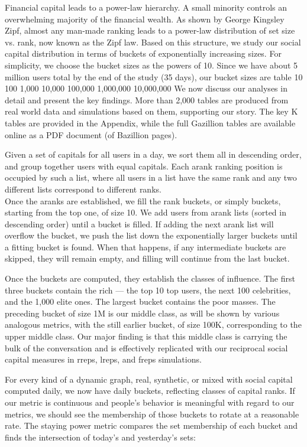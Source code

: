 \documentclass[10pt,oneside]{memoir}
\begin{document}
Financial capital leads to a power-law hierarchy.  A small minority controls an overwhelming majority of the financial wealth.  As shown by George Kingsley Zipf, almost any man-made ranking leads to a power-law distribution of set size vs. rank, now known as the Zipf law.  Based on this structure, we study our social capital distribution in terms of buckets of exponentially increasing sizes.
For simplicity, we choose the bucket sizes as the powers of 10.  Since we have about 5 million users total by the end of the study (35 days), our bucket sizes are
table
10 100 1,000 10,000 100,000 1,000,000 10,000,000
We now discuss our analyses in detail and present the key findings.  More than 2,000 tables are produced from real world data and simulations based on them, supporting our story.  The key K tables are provided in the Appendix, while the full Gazillion  tables are available online as a PDF document (of Bazillion pages).


Given a set of capitals for all users in a day, we sort them all in descending order, and group together users with equal capitals.  Each arank ranking position is occupied by such a list, where all users in a list have the same rank and any two different lists correspond to different ranks. \\
Once the aranks are established, we fill the rank buckets, or simply buckets, starting from the top one, of size 10.  We add users from arank lists (sorted in descending order) until a bucket is filled.  If adding the next arank list will overflow the bucket, we push the list down the exponentially larger buckets until a fitting bucket is found.  When that happens, if any intermediate buckets are skipped, they will remain empty, and filling will continue from the last bucket.


Once the buckets are computed, they establish the classes of influence.  The first three buckets contain the rich --- the top 10 top users, the next 100 celebrities, and the 1,000 elite ones.  The largest bucket contains the poor masses.  The preceding bucket of size 1M is our middle class, as will be shown by various analogous metrics, with the still earlier bucket, of size 100K, corresponding to the upper middle class. Our major finding is that this middle class is carrying the bulk of the conversation and is effectively replicated with our reciprocal social capital measures in rreps, lreps, and freps simulations.


For every kind of a dynamic graph, real, synthetic, or mixed with social capital computed daily, we now have daily buckets, reflecting classes of capital ranks.  If our metric is continuous and people's behavior is meaningful with regard to our metrics, we should see the membership of those buckets to rotate at a reasonable rate.  The staying power metric compares the set membership of each bucket and finds the intersection of today's and yesterday's sets:
\end{document}
